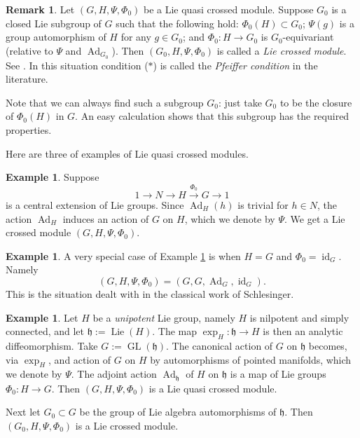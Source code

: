 \documentclass[10pt, a4paper]{amsart}
\theoremstyle{definition}
\newtheorem{rem}[equation]{Remark}
\newtheorem{exa}[equation]{Example}
\numberwithin{equation}{section}
\newcommand{\xar}{\xrightarrow}
\newcommand{\opn}{\operatorname}
\newcommand{\mfrak}[1]{\mathfrak{#1}}
\newcommand{\h}{\mfrak{h}}
\begin{document}
\begin{rem} \label{rem:1}
Let $(G, H, \Psi, \Phi_0)$ be a Lie quasi crossed module.
Suppose $G_0$ is a closed Lie subgroup of $G$ such that the following hold:
$\Phi_0(H) \subset G_0$; $\Psi(g)$ is a group automorphism of $H$ for any
$g \in G_0$; and $\Phi_0 : H \to G_0$ is $G_0$-equivariant 
(relative to $\Psi$ and $\opn{Ad}_{G_0}$). 
Then $(G_0, H, \Psi, \Phi_0)$ is called a {\em Lie crossed module}.
See \cite{BM, BS}.
In this situation condition ($*$) is called the {\em Pfeiffer condition} in
the literature. 

Note that we can always find such a subgroup $G_0$: just take
$G_0$ to be the closure of $\Phi_0(H)$ in $G$. 
An easy calculation shows that this subgroup has the required properties.
\end{rem}

Here are three of examples of Lie quasi crossed modules. 

\begin{exa} \label{exa:4}
Suppose 
\[ 1 \to N \to H \xar{\Phi_0} G \to 1 \]
is a central extension of Lie groups. Since $\opn{Ad}_H(h)$ is trivial for
$h \in N$, the action $\opn{Ad}_H$ induces an action of $G$ on $H$, which we
denote by $\Psi$. We  get a Lie crossed module $(G, H, \Psi, \Phi_0)$.
\end{exa}

\begin{exa} \label{exa:2}
A very special case of Example \ref{exa:4} is when $H = G$ and 
$\Phi_0 = \opn{id}_G$. Namely
\[ (G, H, \Psi, \Phi_0) = (G, G, \opn{Ad}_G, \opn{id}_G) . \]
This is the situation dealt with in the classical work of Schlesinger. 
\end{exa}

\begin{exa} \label{exa:5}
Let $H$ be a {\em unipotent} Lie group, namely $H$ is nilpotent and simply
connected, and let $\h := \opn{Lie}(H)$. The map $\exp_H : \h \to H$ is then an
analytic diffeomorphism. 
Take $G := \opn{GL}(\h)$. The canonical action of $G$ on $\h$ becomes, via
$\exp_H$, and action of $G$ on $H$ by automorphisms of pointed manifolds, which
we denote by $\Psi$. The adjoint action $\opn{Ad}_{\h}$ of $H$ on $\h$ 
is a map of Lie groups $\Phi_0 : H \to G$. Then 
$(G, H, \Psi, \Phi_0)$ is a Lie quasi crossed module. 

Next let $G_0 \subset G$ be the group of Lie algebra automorphisms of $\h$. 
Then $(G_0, H, \Psi, \Phi_0)$ is a Lie crossed module. 
\end{exa}
\end{document}
